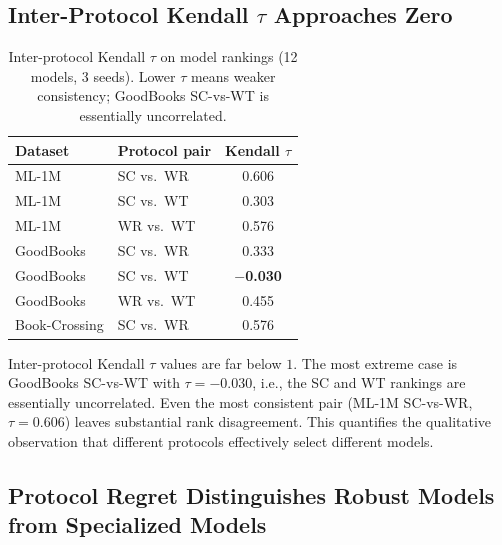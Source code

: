 \documentclass[journal]{IEEEtran}
\begin{document}
\subsection{Inter-Protocol Kendall $\tau$ Approaches Zero}
\label{sec:kendall_results}

\begin{table}[!t]
\centering
\caption{Inter-protocol Kendall $\tau$ on model rankings (12 models, 3 seeds). Lower $\tau$ means weaker consistency; GoodBooks SC-vs-WT is essentially uncorrelated.}
\label{tab:kendall}
\footnotesize
\begin{tabular}{@{}llc@{}}
\toprule
Dataset & Protocol pair & Kendall $\tau$ \\
\midrule
ML-1M         & SC vs.\ WR & 0.606 \\
ML-1M         & SC vs.\ WT & 0.303 \\
ML-1M         & WR vs.\ WT & 0.576 \\
GoodBooks     & SC vs.\ WR & 0.333 \\
GoodBooks     & SC vs.\ WT & \textbf{$-$0.030} \\
GoodBooks     & WR vs.\ WT & 0.455 \\
Book-Crossing & SC vs.\ WR & 0.576 \\
\bottomrule
\end{tabular}
\end{table}

Inter-protocol Kendall $\tau$ values are far below $1$. The most extreme case is GoodBooks SC-vs-WT with $\tau=-0.030$, i.e., the SC and WT rankings are essentially uncorrelated. Even the most consistent pair (ML-1M SC-vs-WR, $\tau=0.606$) leaves substantial rank disagreement. This quantifies the qualitative observation that different protocols effectively select different models.

\subsection{Protocol Regret Distinguishes Robust Models from Specialized Models}
\label{sec:regret_results}
\end{document}
